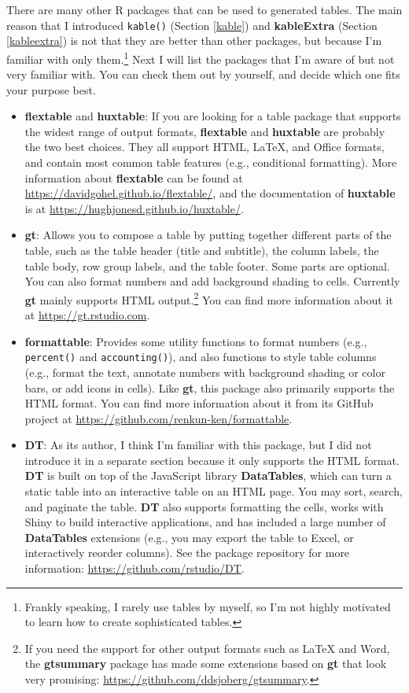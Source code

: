 \documentclass[
  11pt,
]{krantz}
\begin{document}
There are many other R packages that can be used to generated tables. The main reason that I introduced \texttt{kable()} (Section \ref{kable}) and \textbf{kableExtra} (Section \ref{kableextra}) is not that they are better than other packages, but because I'm familiar with only them.\footnote{Frankly speaking, I rarely use tables by myself, so I'm not highly motivated to learn how to create sophisticated tables.} Next I will list the packages that I'm aware of but not very familiar with. You can check them out by yourself, and decide which one fits your purpose best.

\begin{itemize}
\item
  \textbf{flextable} and \textbf{huxtable}: If you are looking for a table package that supports the widest range of output formats, \textbf{flextable} and \textbf{huxtable} are probably the two best choices. They all support HTML, LaTeX, and Office formats, and contain most common table features (e.g., conditional formatting). More information about \textbf{flextable} can be found at \url{https://davidgohel.github.io/flextable/}, and the documentation of \textbf{huxtable} is at \url{https://hughjonesd.github.io/huxtable/}.
\item
  \textbf{gt}: Allows you to compose a table by putting together different parts of the table, such as the table header (title and subtitle), the column labels, the table body, row group labels, and the table footer. Some parts are optional. You can also format numbers and add background shading to cells. Currently \textbf{gt} mainly supports HTML output.\footnote{If you need the support for other output formats such as LaTeX and Word, the \textbf{gtsummary} package has made some extensions based on \textbf{gt} that look very promising: \url{https://github.com/ddsjoberg/gtsummary}.} You can find more information about it at \url{https://gt.rstudio.com}.
\item
  \textbf{formattable}: Provides some utility functions to format numbers (e.g., \texttt{percent()} and \texttt{accounting()}), and also functions to style table columns (e.g., format the text, annotate numbers with background shading or color bars, or add icons in cells). Like \textbf{gt}, this package also primarily supports the HTML format. You can find more information about it from its GitHub project at \url{https://github.com/renkun-ken/formattable}.
\item
  \textbf{DT}: As its author, I think I'm familiar with this package, but I did not introduce it in a separate section because it only supports the HTML format. \textbf{DT} is built on top of the JavaScript library \textbf{DataTables}, which can turn a static table into an interactive table on an HTML page. You may sort, search, and paginate the table. \textbf{DT} also supports formatting the cells, works with Shiny to build interactive applications, and has included a large number of \textbf{DataTables} extensions (e.g., you may export the table to Excel, or interactively reorder columns). See the package repository for more information: \url{https://github.com/rstudio/DT}.

\end{itemize}
\end{document}
